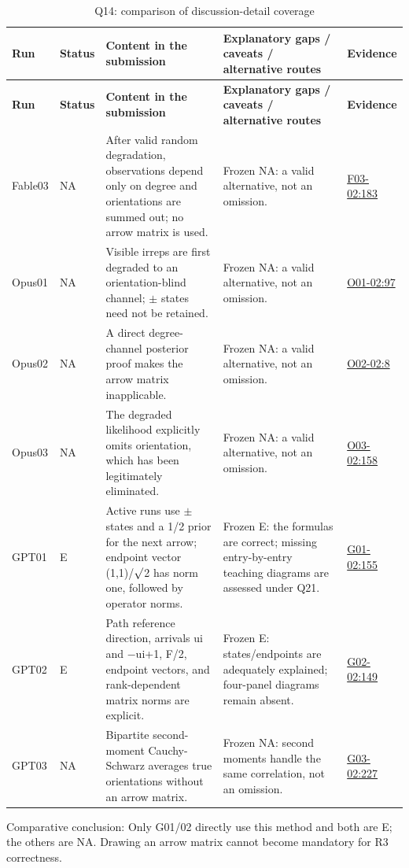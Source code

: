 \documentclass[11pt,a4paper]{article}
\begin{document}
{\fontsize{9.0}{12.6}\selectfont
\setlength{\tabcolsep}{2.5pt}
\begin{longtable}{>{\raggedright\arraybackslash}p{}>{\raggedright\arraybackslash}p{}>{\raggedright\arraybackslash}p{}>{\raggedright\arraybackslash}p{}>{\raggedright\arraybackslash}p{}}
\caption{Q14: comparison of discussion-detail coverage}\\
\toprule
\textbf{Run} & \textbf{Status} & \textbf{Content in the submission} & \textbf{Explanatory gaps /\allowbreak{} caveats /\allowbreak{} alternative routes} & \textbf{Evidence}\tabularnewline
\midrule
\endfirsthead
\toprule
\textbf{Run} & \textbf{Status} & \textbf{Content in the submission} & \textbf{Explanatory gaps /\allowbreak{} caveats /\allowbreak{} alternative routes} & \textbf{Evidence}\tabularnewline
\midrule
\endhead
{}Fable03 & NA & After valid random degradation,\allowbreak{} observations depend only on degree and orientations are summed out; no arrow matrix is used. & Frozen NA: a valid alternative,\allowbreak{} not an omission. & \hyperref[src:F03-02]{F03-02:183}\tabularnewline
{}Opus01 & NA & Visible irreps are first degraded to an orientation-blind channel; \ensuremath{\pm} states need not be retained. & Frozen NA: a valid alternative,\allowbreak{} not an omission. & \hyperref[src:O01-02]{O01-02:97}\tabularnewline
{}Opus02 & NA & A direct degree-channel posterior proof makes the arrow matrix inapplicable. & Frozen NA: a valid alternative,\allowbreak{} not an omission. & \hyperref[src:O02-02]{O02-02:8}\tabularnewline
{}Opus03 & NA & The degraded likelihood explicitly omits orientation,\allowbreak{} which has been legitimately eliminated. & Frozen NA: a valid alternative,\allowbreak{} not an omission. & \hyperref[src:O03-02]{O03-02:158}\tabularnewline
{}GPT01 & E & Active runs use \ensuremath{\pm} states and a 1/\allowbreak{}2 prior for the next arrow; endpoint vector (1,\allowbreak{}1)/\allowbreak{}\ensuremath{\surd}2 has norm one,\allowbreak{} followed by operator norms. & Frozen E: the formulas are correct; missing entry-by-entry teaching diagrams are assessed under Q21. & \hyperref[src:G01-02]{G01-02:155}\tabularnewline
{}GPT02 & E & Path reference direction,\allowbreak{} arrivals ui and \ensuremath{-}ui+1,\allowbreak{} F/\allowbreak{}2,\allowbreak{} endpoint vectors,\allowbreak{} and rank-dependent matrix norms are explicit. & Frozen E: states/\allowbreak{}endpoints are adequately explained; four-panel diagrams remain absent. & \hyperref[src:G02-02]{G02-02:149}\tabularnewline
{}GPT03 & NA & Bipartite second-moment Cauchy-Schwarz averages true orientations without an arrow matrix. & Frozen NA: second moments handle the same correlation,\allowbreak{} not an omission. & \hyperref[src:G03-02]{G03-02:227}\tabularnewline
\bottomrule
\end{longtable}
}
Comparative conclusion: Only G01/\allowbreak{}02 directly use this method and both are E; the others are NA. Drawing an arrow matrix cannot become mandatory for R3 correctness.
\end{document}
